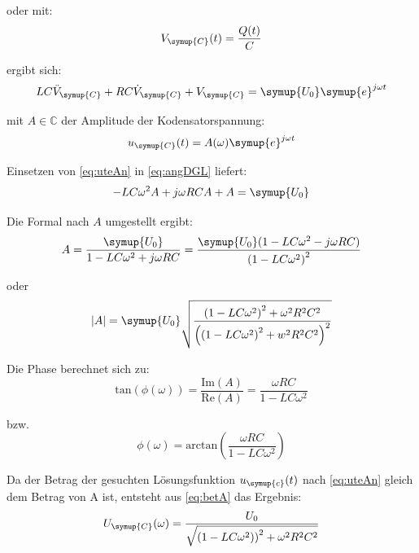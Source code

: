    \noindent oder mit:
    \begin{equation}
        V_{\symup{C}} (t) = \frac{Q(t)}{C} \nonumber
    \end{equation}

    \noindent ergibt sich:
    \begin{equation}
        LC \ddot{V}_{\symup{C}} + RC \dot{V}_{\symup{C}} + V_{\symup{C}} = \symup{U_0} \symup{e}^{j \omega t} 
        \label{eq:angDGL}
    \end{equation}

    \noindent mit $A \in  \mathds{C}$ der Amplitude der Kodensatorspannung:
    \begin{equation}
        u_{\symup{C}} (t) = A(\omega) \symup{e}^{j \omega t} 
        \label{eq:uteAn}
    \end{equation}

    \noindent Einsetzen von \ref{eq:uteAn} in \ref{eq:angDGL} liefert:
    \begin{equation}
        -LC \omega^2 A + j\omega RC A +A = \symup{U_0} \nonumber
    \end{equation}

    \noindent Die Formal nach $A$ umgestellt ergibt:
    \begin{equation}
        A= \frac{\symup{U_0}}{1 - LC \omega^2 + j \omega RC} = \frac{ \symup{U_0}(1 -LC \omega^2 - j\omega RC)}{\left( 1- LC \omega^2 \right)^2} \nonumber
    \end{equation}
    
    \noindent oder
    \begin{equation}
        |A|= \symup{U_0} \sqrt{\frac{\left(1-LC\omega^2\right)^2 + \omega^2 R^2C^2}{\left( \left(1 -LC \omega^2\right)^2 +w^2R^2C^2 \right)^2}}
        \label{eq:betA}
    \end{equation}

    \noindent Die Phase berechnet sich zu:
    \begin{equation}
        \text{tan}(\phi (\omega)) = \frac{\text{Im}(A)}{\text{Re}(A)} = \frac{\omega RC}{1 - LC\omega^2} \nonumber
    \end{equation}

    \noindent bzw.
    \begin{equation}
        \phi (\omega) = \text{arctan}\left(\frac{\omega RC}{1 - LC\omega^2} \right)
        \label{eq:phi}
    \end{equation}

    \noindent Da der Betrag der gesuchten Lösungsfunktion $u_{\symup{c}}(t)$ nach \ref{eq:uteAn} gleich dem Betrag von A ist, entsteht aus 
    \ref{eq:betA} das Ergebnis:
    \begin{equation}
        U_{\symup{C}}(\omega) = \frac{U_0}{\sqrt{\left(1-LC\omega^2)\right)^2 + \omega^2 R^2 C^2}} 
        \label{eq:Ucw}
    \end{equation}

